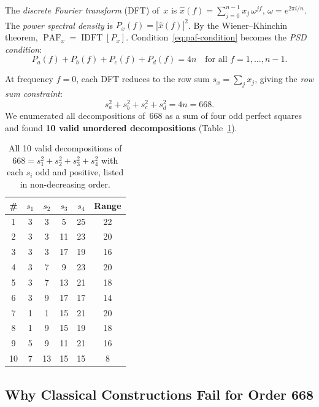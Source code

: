 \documentclass[11pt,a4paper]{article}
\DeclareMathOperator{\PAF}{PAF}
\DeclareMathOperator{\IDFT}{IDFT}
\begin{document}
The \emph{discrete Fourier transform} (DFT) of~$x$ is $\hat{x}(f) =
\sum_{j=0}^{n-1} x_j\, \omega^{jf}$, $\omega = e^{2\pi i/n}$.  The
\emph{power spectral density} is $P_x(f) = |\hat{x}(f)|^2$.  By the
Wiener--Khinchin theorem, $\PAF_x = \IDFT[P_x]$.
Condition~\eqref{eq:paf-condition} becomes the \emph{PSD condition}:
\begin{equation}\label{eq:psd}
  P_a(f) + P_b(f) + P_c(f) + P_d(f) = 4n
  \quad \text{for all } f = 1, \ldots, n-1.
\end{equation}

At frequency $f=0$, each DFT reduces to the row sum $s_x = \sum_j x_j$,
giving the \emph{row sum constraint}:
\begin{equation}\label{eq:rowsum}
  s_a^2 + s_b^2 + s_c^2 + s_d^2 = 4n = 668.
\end{equation}
We enumerated all decompositions of~668 as a sum of four odd perfect
squares and found \textbf{10 valid unordered decompositions}
(Table~\ref{tab:rowsums}).

\begin{table}[t]
  \centering
  \caption{All 10 valid decompositions of $668 = s_1^2 + s_2^2 + s_3^2 + s_4^2$
    with each $s_i$ odd and positive, listed in non-decreasing
    order.}\label{tab:rowsums}
  \begin{tabular}{cccccc}
    \toprule
    \# & $s_1$ & $s_2$ & $s_3$ & $s_4$ & Range \\
    \midrule
     1 & 3 & 3 &  5 & 25 & 22 \\
     2 & 3 & 3 & 11 & 23 & 20 \\
     3 & 3 & 3 & 17 & 19 & 16 \\
     4 & 3 & 7 &  9 & 23 & 20 \\
     5 & 3 & 7 & 13 & 21 & 18 \\
     6 & 3 & 9 & 17 & 17 & 14 \\
     7 & 1 & 1 & 15 & 21 & 20 \\
     8 & 1 & 9 & 15 & 19 & 18 \\
     9 & 5 & 9 & 11 & 21 & 16 \\
    10 & 7 & 13& 15 & 15 &  8 \\
    \bottomrule
  \end{tabular}
\end{table}

\subsection{Why Classical Constructions Fail for Order 668}\label{sec:classical-fail}
\end{document}
